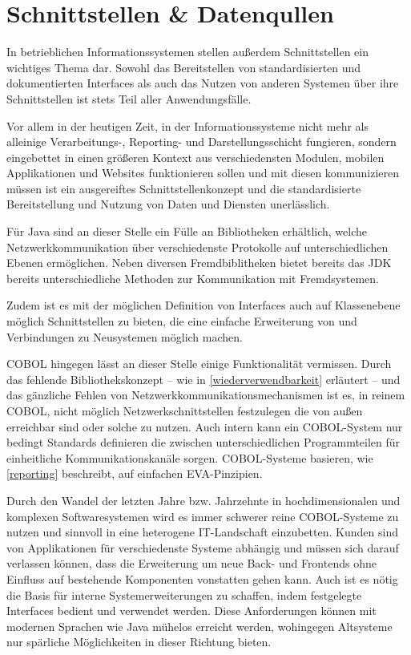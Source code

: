 \section{Schnittstellen \& Datenqullen}
In betrieblichen Informationssystemen stellen außerdem Schnittstellen ein wichtiges Thema dar. Sowohl das Bereitstellen von standardisierten und dokumentierten Interfaces als auch das Nutzen von anderen Systemen über ihre Schnittstellen ist stets Teil aller Anwendungsfälle. 

Vor allem in der heutigen Zeit, in der Informationssysteme nicht mehr als alleinige Verarbeitungs-, Reporting- und Darstellungsschicht fungieren, sondern eingebettet in einen größeren Kontext aus verschiedensten Modulen, mobilen Applikationen und Websites funktionieren sollen und mit diesen kommunizieren müssen ist ein ausgereiftes Schnittstellenkonzept und die standardisierte Bereitstellung und Nutzung von Daten und Diensten unerlässlich.

Für Java sind an dieser Stelle ein Fülle an Bibliotheken erhältlich, welche Netzwerkkommunikation über verschiedenste Protokolle auf unterschiedlichen Ebenen ermöglichen. Neben diversen Fremdbiblitheken bietet bereits das JDK bereits unterschiedliche Methoden zur Kommunikation mit Fremdsystemen.

Zudem ist es mit der möglichen Definition von Interfaces auch auf Klassenebene möglich Schnittstellen zu bieten, die eine einfache Erweiterung von und Verbindungen zu Neusystemen möglich machen.

COBOL hingegen lässt an dieser Stelle einige Funktionalität vermissen. Durch das fehlende Bibliothekskonzept -- wie in \autoref{wiederverwendbarkeit} erläutert -- und das gänzliche Fehlen von Netzwerkkommunikationsmechanismen ist es, in reinem COBOL, nicht möglich Netzwerkschnittstellen festzulegen die von außen erreichbar sind oder solche zu nutzen. Auch intern kann ein COBOL-System nur bedingt Standards definieren die zwischen unterschiedlichen Programmteilen für einheitliche Kommunikationskanäle sorgen. COBOL-Systeme basieren, wie \autoref{reporting} beschreibt, auf einfachen EVA-Pinzipien.

Durch den Wandel der letzten Jahre bzw. Jahrzehnte in hochdimensionalen und komplexen Softwaresystemen wird es immer schwerer reine COBOL-Systeme zu nutzen und sinnvoll in eine heterogene IT-Landschaft einzubetten. Kunden sind von Applikationen für verschiedenste Systeme abhängig und müssen sich darauf verlassen können, dass die Erweiterung um neue Back- und Frontends ohne Einfluss auf bestehende Komponenten vonstatten gehen kann. Auch ist es nötig die Basis für interne Systemerweiterungen zu schaffen, indem festgelegte Interfaces bedient und verwendet werden. Diese Anforderungen können mit modernen Sprachen wie Java mühelos erreicht werden, wohingegen Altsysteme nur spärliche Möglichkeiten in dieser Richtung bieten.
